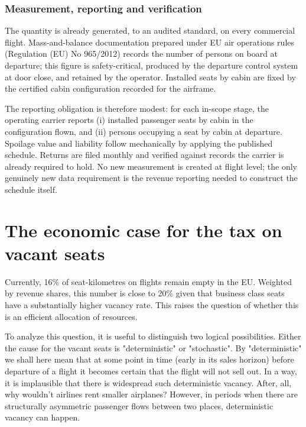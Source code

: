 \documentclass{article}
\begin{document}
\subsubsection{Measurement, reporting and verification}
The quantity is already generated, to an audited standard, on every commercial flight. Mass-and-balance documentation prepared under EU air operations rules (Regulation (EU) No 965/2012) records the number of persons on board at departure; this figure is safety-critical, produced by the departure control system at door close, and retained by the operator. Installed seats by cabin are fixed by the certified cabin configuration recorded for the airframe.

The reporting obligation is therefore modest: for each in-scope stage, the operating carrier reports (i) installed passenger seats by cabin in the configuration flown, and (ii) persons occupying a seat by cabin at departure. Spoilage value and liability follow mechanically by applying the published schedule. Returns are filed monthly and verified against records the carrier is already required to hold. No new measurement is created at flight level; the only genuinely new data requirement is the revenue reporting needed to construct the schedule itself.

\section{The economic case for the tax on vacant seats}

Currently, 16\%  of seat-kilometres on flights remain empty in the EU. Weighted by revenue shares, this number is close to 20\%  given that business class seats have a substantially higher vacancy rate. This raises the question of whether this is an efficient allocation of resources.

To analyze this question, it is useful to distinguish two logical possibilities. Either the cause for the vacant seats is "deterministic" or "stochastic". By "deterministic" we shall here mean that at some point in time (early in its sales horizon) before departure of a flight it becomes certain that the flight will not sell out. In a way, it is implausible that there is widespread such deterministic vacancy. After, all, why wouldn't airlines rent smaller airplanes? However, in periods when there are structurally asymmetric passenger flows between two places, deterministic vacancy can happen.
\end{document}
